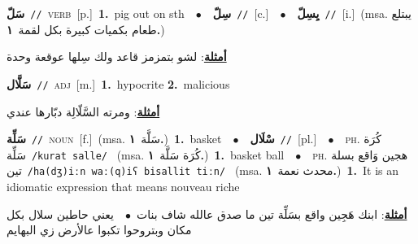 \documentclass[10pt,a4paper,twoside]{article} %
\begin{document}
\begin{multicols}{2}
{\setlength\topsep{0pt}\textbf{\foreignlanguage{arabic}{سَلّ}}\ {\color{gray}\texttt{//}\color{black}}\ \textsc{verb}\ [p.]\ \textbf{1.}~pig out on sth\ \ $\bullet$\ \ \setlength\topsep{0pt}\textbf{\foreignlanguage{arabic}{سِلّ}}\ {\color{gray}\texttt{//}\color{black}}\ [c.]\ \ $\bullet$\ \ \setlength\topsep{0pt}\textbf{\foreignlanguage{arabic}{يِسِلّ}}\ {\color{gray}\texttt{//}\color{black}}\ [i.]\ \color{gray}(msa. \foreignlanguage{arabic}{يبتلع طعام بكميات كبيرة بكل لقمة}~\foreignlanguage{arabic}{\textbf{١.}})\color{black}\  \begin{flushright}\color{gray}\foreignlanguage{arabic}{\textbf{\underline{\foreignlanguage{arabic}{أمثلة}}}: لشو بتمزمز قاعد ولك سِلها عوقعة وحدة}\end{flushright}\color{black}} \vspace{2mm}

{\setlength\topsep{0pt}\textbf{\foreignlanguage{arabic}{سَلَّال}}\ {\color{gray}\texttt{//}\color{black}}\ \textsc{adj}\ [m.]\ \textbf{1.}~hypocrite  \textbf{2.}~malicious\  \begin{flushright}\color{gray}\foreignlanguage{arabic}{\textbf{\underline{\foreignlanguage{arabic}{أمثلة}}}: ومرته السَّلّالِة دبّارها عندي}\end{flushright}\color{black}} \vspace{2mm}

{\setlength\topsep{0pt}\textbf{\foreignlanguage{arabic}{سَلِّة}}\ {\color{gray}\texttt{//}\color{black}}\ \textsc{noun}\ [f.]\ \color{gray}(msa. \foreignlanguage{arabic}{سَلَّة}~\foreignlanguage{arabic}{\textbf{١.}})\color{black}\ \textbf{1.}~basket\ \ $\bullet$\ \ \setlength\topsep{0pt}\textbf{\foreignlanguage{arabic}{سْلَال}}\ {\color{gray}\texttt{//}\color{black}}\ [pl.]\ \ $\bullet$\ \ \textsc{ph.} \color{gray} \foreignlanguage{arabic}{كُرَة سَلِّة}\color{black}\ {\color{gray}\texttt{/{\sffamily kurat salle}/}\color{black}}\ \color{gray} (msa. \foreignlanguage{arabic}{كُرَة سَلَّة}~\foreignlanguage{arabic}{\textbf{١.}})\color{black}\ \textbf{1.}~basket ball\ \ $\bullet$\ \ \textsc{ph.} \color{gray} \foreignlanguage{arabic}{هجين وَاقع بسلة تين}\color{black}\ {\color{gray}\texttt{/{\sffamily ha(dʒ)iːn waː(q)iʕ bisallit tiːn}/}\color{black}}\ \color{gray} (msa. \foreignlanguage{arabic}{محدث نعمة}~\foreignlanguage{arabic}{\textbf{١.}})\color{black}\ \textbf{1.}~It is an idiomatic expression that means nouveau riche\  \begin{flushright}\color{gray}\foreignlanguage{arabic}{\textbf{\underline{\foreignlanguage{arabic}{أمثلة}}}: ابنك هَجِين واقع بسَلِّة تين ما صدق عالله شاف بنات\ $\bullet$\ \  يعني حاطين سلال بكل مكان وبتروحوا تكبوا عالأرض زي البهايم}\end{flushright}\color{black}} \vspace{2mm}


\end{multicols}
\end{document}
